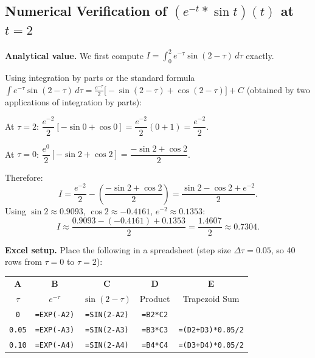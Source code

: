 \documentclass[12pt,a4paper]{article}
\begin{document}
\subsection*{Numerical Verification of $(e^{-t} * \sin t)(t)$ at $t = 2$}

\textbf{Analytical value.} We first compute
$\displaystyle I = \int_0^2 e^{-\tau}\sin(2-\tau)\,d\tau$ exactly.

Using integration by parts or the standard formula
$\displaystyle\int e^{-\tau}\sin(2-\tau)\,d\tau
 = \frac{e^{-\tau}}{2}\bigl[-\sin(2-\tau) + \cos(2-\tau)\bigr] + C$
(obtained by two applications of integration by parts):

At $\tau = 2$:
$\dfrac{e^{-2}}{2}[-\sin 0 + \cos 0] = \dfrac{e^{-2}}{2}(0+1) = \dfrac{e^{-2}}{2}$.

At $\tau = 0$:
$\dfrac{e^{0}}{2}[-\sin 2 + \cos 2] = \dfrac{-\sin 2 + \cos 2}{2}$.

Therefore:
\[
  I = \frac{e^{-2}}{2} - \left(\frac{-\sin 2 + \cos 2}{2}\right)
    = \frac{\sin 2 - \cos 2 + e^{-2}}{2}.
\]
Using $\sin 2 \approx 0.9093$, $\cos 2 \approx -0.4161$, $e^{-2}\approx 0.1353$:
\[
  I \approx \frac{0.9093 - (-0.4161) + 0.1353}{2}
          = \frac{1.4607}{2}
          \approx 0.7304.
\]

\medskip
\textbf{Excel setup.} Place the following in a spreadsheet
(step size $\Delta\tau = 0.05$, so 40 rows from $\tau=0$ to $\tau=2$):

\begin{center}
\begin{tabular}{@{}ccccc@{}}
\toprule
\textbf{A} & \textbf{B} & \textbf{C} & \textbf{D} & \textbf{E} \\
$\tau$ & $e^{-\tau}$ & $\sin(2-\tau)$ & Product & Trapezoid Sum \\
\midrule
\texttt{0}    & \texttt{=EXP(-A2)}           & \texttt{=SIN(2-A2)}           & \texttt{=B2*C2} & \\
\texttt{0.05} & \texttt{=EXP(-A3)}           & \texttt{=SIN(2-A3)}           & \texttt{=B3*C3} & \texttt{=(D2+D3)*0.05/2} \\
\texttt{0.10} & \texttt{=EXP(-A4)}           & \texttt{=SIN(2-A4)}           & \texttt{=B4*C4} & \texttt{=(D3+D4)*0.05/2} \\
\bottomrule
\end{tabular}
\end{center}
\end{document}
